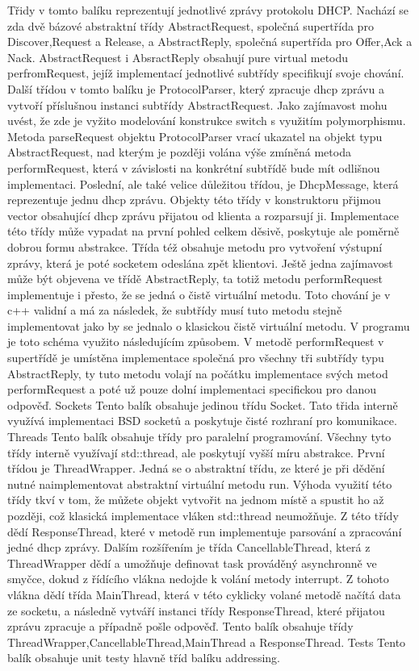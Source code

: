 \documentclass[12pt,a4paper]{report}
\begin{document}
Třidy v tomto balíku reprezentují jednotlivé zprávy protokolu DHCP. Nachází se zda dvě bázové abstraktní třídy AbstractRequest, společná supertřída pro Discover,Request a Release, a AbstractReply, společná supertřída pro Offer,Ack a Nack. AbstractRequest i AbsractReply obsahují pure virtual metodu perfromRequest, jejíž implementací jednotlivé subtřídy specifikují svoje chování. Další třídou v tomto balíku je ProtocolParser, který zpracuje dhcp zprávu a vytvoří příslušnou instanci subtřídy AbstractRequest. Jako zajímavost mohu uvést, že zde je vyžito modelování konstrukce switch s využitím polymorphismu. Metoda parseRequest objektu ProtocolParser vrací ukazatel na objekt typu AbstractRequest, nad kterým je později volána výše zmíněná metoda performRequest, která v závislosti na konkrétní subtřídě bude mít odlišnou implementaci. Poslední, ale také velice důležitou třídou, je DhcpMessage, která reprezentuje jednu dhcp zprávu. Objekty této třídy v konstruktoru přijmou vector obsahující dhcp zprávu přijatou od klienta a rozparsují ji. Implementace této třídy může vypadat na první pohled celkem děsivě, poskytuje ale poměrně dobrou formu abstrakce. Třída též obsahuje metodu pro vytvoření výstupní zprávy, která je poté socketem odeslána zpět klientovi. Ještě jedna zajímavost může být objevena ve třídě AbstractReply, ta totiž metodu performRequest implementuje i přesto, že se jedná o čistě virtuální metodu. Toto chování je v c++ validní a má za následek, že subtřídy musí tuto metodu stejně implementovat jako by se jednalo o klasickou čistě virtuální metodu. V programu je toto schéma využito následujícím způsobem. V metodě performRequest v supertřídě je umístěna implementace společná pro všechny tři subtřídy typu AbstractReply, ty tuto metodu volají na počátku implementace svých metod performRequest a poté už pouze dolní implementaci specifickou pro danou odpověď.
Sockets
Tento balík obsahuje jedinou třídu Socket. Tato třida interně využívá implementaci BSD socketů a poskytuje čisté rozhraní pro komunikace. 
Threads
Tento balík obsahuje třídy pro paralelní programování. Všechny tyto třídy interně využívají std::thread, ale poskytují vyšší míru abstrakce. První třídou je ThreadWrapper. Jedná se o abstraktní třídu, ze které je při dědění nutné naimplementovat abstraktní virtuální metodu run. Výhoda využití této třídy tkví v tom, že můžete objekt vytvořit na jednom místě a spustit ho až později, což klasická implementace vláken std::thread neumožňuje. Z této třídy dědí ResponseThread, které v metodě run implementuje parsování a zpracování jedné dhcp zprávy. Dalším rozšířením je třída CancellableThread, která z ThreadWrapper dědí a umožňuje definovat task prováděný asynchronně ve smyčce, dokud z řídícího vlákna nedojde k volání metody interrupt. Z tohoto vlákna dědí třída MainThread, která v této cyklicky volané metodě načítá data ze socketu,  a následně vytváří instanci třídy ResponseThread, které přijatou zprávu zpracuje a případně pošle odpověď.
Tento balík obsahuje třídy ThreadWrapper,CancellableThread,MainThread a ResponseThread.
Tests
Tento balík obsahuje unit testy hlavně tříd balíku  addressing.
\end{document}
